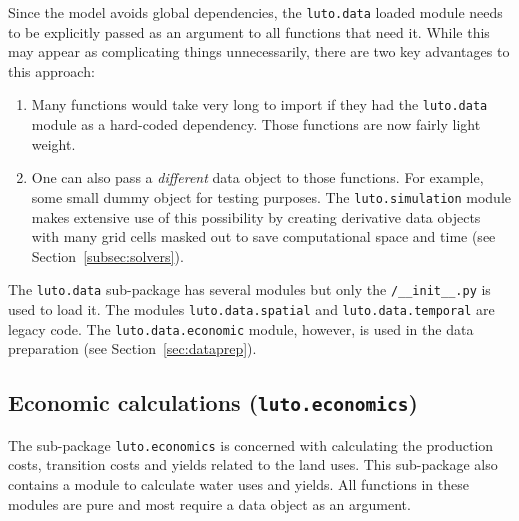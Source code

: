 \documentclass{draft}
\begin{document}
Since the model avoids global dependencies, the \texttt{luto.data} loaded module needs to be explicitly passed as an argument to all functions that need it. While this may appear as complicating things unnecessarily, there are two key advantages to this approach:
\begin{enumerate}
	\item Many functions would take very long to import if they had the \texttt{luto.data} module as a hard-coded dependency. Those functions are now fairly light weight.
	\item One can also pass a \emph{different} data object to those functions. For example, some small dummy object for testing purposes. The \texttt{luto.simulation} module makes extensive use of this possibility by creating derivative data objects with many grid cells masked out to save computational space and time (see Section~\ref{subsec:solvers}).
\end{enumerate}

The \texttt{luto.data} sub-package has several modules but only the \texttt{/__init__.py} is used to load it. The modules
\texttt{luto.data.spatial} and \texttt{luto.data.temporal} are legacy code. The \texttt{luto.data.economic} module, however, is used in the data preparation (see Section~\ref{sec:dataprep}).

\subsection{Economic calculations (\texttt{luto.economics})}
The sub-package \texttt{luto.economics} is concerned with calculating the production costs, transition costs and yields related to the land uses. This sub-package also contains a module to calculate water uses and yields. All functions in these modules are pure and most require a data object as an argument.
\end{document}
